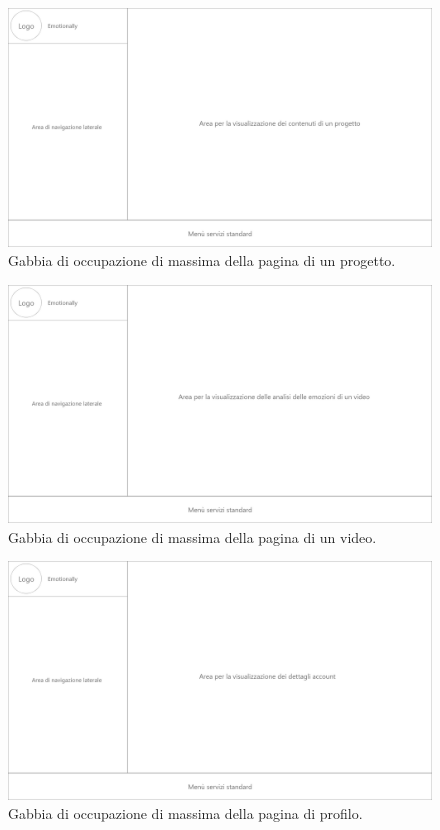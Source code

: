 \begin{figure}[H]
	\centering
	\caption{Gabbia di occupazione di massima della pagina di un progetto.}
	\label{fig:gabbie-massima:project}
	\includegraphics[width=\textwidth]{images/gabbie-di-massima/Progetto}
\end{figure}

\begin{figure}[H]
	\centering
	\caption{Gabbia di occupazione di massima della pagina di un video.}
	\label{fig:gabbie-massima:video}
	\includegraphics[width=\textwidth]{images/gabbie-di-massima/Video}
\end{figure}

\begin{figure}[H]
	\centering
	\caption{Gabbia di occupazione di massima della pagina di profilo.}
	\label{fig:gabbie-massima:profilo}
	\includegraphics[width=\textwidth]{images/gabbie-di-massima/Profilo}
\end{figure}

